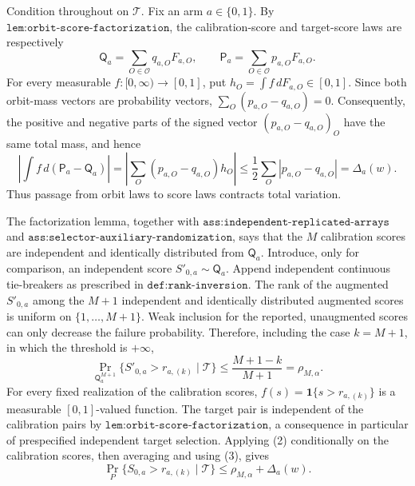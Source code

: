 Condition throughout on \(\mathcal T\). Fix an arm \(a\in\{0,1\}\). By \(\texttt{lem:orbit-score-factorization}\), the calibration-score and target-score laws are respectively
\[\mathsf Q_a=\sum_{O\in\mathcal O}q_{a,O}F_{a,O},\qquad \mathsf P_a=\sum_{O\in\mathcal O}p_{a,O}F_{a,O}.\tag{1}\]
For every measurable \(f:[0,\infty)\to[0,1]\), put \(h_O=\int f\,dF_{a,O}\in[0,1]\). Since both orbit-mass vectors are probability vectors, \(\sum_O(p_{a,O}-q_{a,O})=0\). Consequently, the positive and negative parts of the signed vector \((p_{a,O}-q_{a,O})_O\) have the same total mass, and hence
\[\left|\int f\,d(\mathsf P_a-\mathsf Q_a)\right|=\left|\sum_O(p_{a,O}-q_{a,O})h_O\right|\le \frac12\sum_O|p_{a,O}-q_{a,O}|=\Delta_a(w).\tag{2}\]
Thus passage from orbit laws to score laws contracts total variation.

The factorization lemma, together with \(\texttt{ass:independent-replicated-arrays}\) and \(\texttt{ass:selector-auxiliary-randomization}\), says that the \(M\) calibration scores are independent and identically distributed from \(\mathsf Q_a\). Introduce, only for comparison, an independent score \(S'_{0,a}\sim\mathsf Q_a\). Append independent continuous tie-breakers as prescribed in \(\texttt{def:rank-inversion}\). The rank of the augmented \(S'_{0,a}\) among the \(M+1\) independent and identically distributed augmented scores is uniform on \(\{1,\ldots,M+1\}\). Weak inclusion for the reported, unaugmented scores can only decrease the failure probability. Therefore, including the case \(k=M+1\), in which the threshold is \(+\infty\),
\[\Pr_{\mathsf Q_a^{M+1}}\{S'_{0,a}>r_{a,(k)}\mid\mathcal T\}\le\frac{M+1-k}{M+1}=\rho_{M,\alpha}.\tag{3}\]
For every fixed realization of the calibration scores, \(f(s)=\mathbf 1\{s>r_{a,(k)}\}\) is a measurable \([0,1]\)-valued function. The target pair is independent of the calibration pairs by \(\texttt{lem:orbit-score-factorization}\), a consequence in particular of prespecified independent target selection. Applying (2) conditionally on the calibration scores, then averaging and using (3), gives
\[\Pr_P\{S_{0,a}>r_{a,(k)}\mid\mathcal T\}\le\rho_{M,\alpha}+\Delta_a(w).\tag{4}\]

